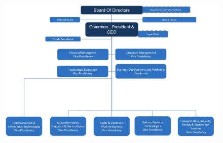 \begin{figure}[H]
\center
\setlength{\unitlength}{\textwidth} 
\includegraphics[width=0.75\unitlength]{organizasyon}
\caption{\label{{fig:orgc}The Organizational Chart of ASELSAN }}
\end{figure}
	

